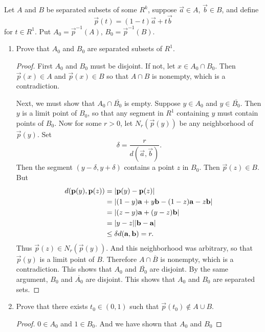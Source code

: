  Let $A$ and $B$ be separated subsets of some $R^k$,
suppose $\vec{a}\in A$, $\vec{b}\in B$, and define
\begin{equation*}
  \vec{p}(t) = (1 - t)\vec{a} + t\vec{b}
\end{equation*}
for $t\in R^1$. Put $A_0 = \vec{p}^{-1}(A)$, $B_0 = \vec{p}^{-1}(B)$.
\begin{enumerate}
\item Prove that $A_0$ and $B_0$ are separated subsets of $R^1$.
  \begin{proof}
    First $A_0$ and $B_0$ must be disjoint. If not, let
    $x\in A_0\cap B_0$. Then $\vec{p}(x)\in A$ and $\vec{p}(x)\in B$
    so that $A\cap B$ is nonempty, which is a contradiction.

    Next, we must show that $A_0\cap\overline{B_0}$ is empty. Suppose
    $y\in A_0$ and $y\in\overline{B_0}$. Then $y$ is a limit point of
    $B_0$, so that any segment in $R^1$ containing $y$ must contain
    points of $B_0$. Now for some $r>0$, let $N_r(\vec{p}(y))$ be any
    neighborhood of $\vec{p}(y)$. Set
    \begin{equation*}
      \delta = \frac{r}{d(\vec{a},\vec{b})}.
    \end{equation*}
    Then the segment $(y - \delta, y + \delta)$ contains a point $z$
    in $B_0$. Then $\vec{p}(z)\in B$. But
    \begin{align*}
      d(\mathbf{p}(y), \mathbf{p}(z))
      &= \lvert{\mathbf{p}(y) - \mathbf{p}(z)}\rvert \\
      &= \lvert{(1 - y)\mathbf{a} + y\mathbf{b} - (1 - z)\mathbf{a} - z\mathbf{b}}\rvert \\
      &= \lvert{(z - y)\mathbf{a} + (y - z)\mathbf{b}}\rvert \\
      &= \lvert{y - z}\rvert\lvert{\mathbf{b} - \mathbf{a}}\rvert \\
      &\leq \delta d(\mathbf{a},\mathbf{b}) = r.
    \end{align*}
    Thus $\vec{p}(z)\in N_r(\vec{p}(y))$. And this neighborhood was
    arbitrary, so that $\vec{p}(y)$ is a limit point of $B$. Therefore
    $A\cap\overline{B}$ is nonempty, which is a contradiction. This
    shows that $A_0$ and $\overline{B_0}$ are disjoint. By the same
    argument, $B_0$ and $\overline{A_0}$ are disjoint. This shows that
    $A_0$ and $B_0$ are separated sets.
  \end{proof}
\item Prove that there exists $t_0\in(0,1)$ such that
  $\vec{p}(t_0)\not\in A\cup B$.
  \begin{proof}
    $0\in A_0$ and $1\in B_0$. And we have shown that $A_0$ and $B_0$

\end{proof}
\end{enumerate}
